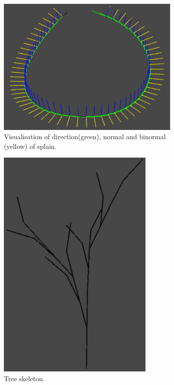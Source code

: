 \documentclass[b5paper,twoside,11pt]{article}
\begin{document}
\begin{figure}[!htbp] 

\begin{subfigure}{.5\textwidth}  
 \centering   
 \includegraphics[width=1.0\linewidth]
 {drawDirection} \caption{Visualisation of direction(green), normal and binormal (yellow) of splain.   \label{unity.drawDirection}} 
\end{subfigure} 
\begin{subfigure}{.5\textwidth}  
 \centering  
  \includegraphics[width=0.5\linewidth]{krzyweDrzewo} 
  \caption{Tree skeleton. \label{unity.krzyweDrzewo}} 
  \end{subfigure}
  \begin{subfigure}{.5\textwidth}

\end{subfigure}
\end{figure}
\end{document}
